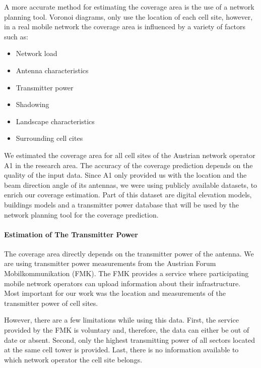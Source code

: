 \documentclass[twocolumn]{bmcart}%
\begin{document}
A more accurate method for estimating the coverage area is the use of a network planning tool. Voronoi diagrams, only use the location of each cell site, however, in a real mobile network the coverage area is influenced by a variety of factors such as:
\begin{itemize}
	\item Network load
	\item Antenna characteristics
	\item Transmitter power
	\item Shadowing
	\item Landscape characteristics
	\item Surrounding cell cites
\end{itemize}

We estimated the coverage area for all cell sites of the Austrian network operator A1 in the research area. The accuracy of the coverage prediction depends on the quality of the input data. Since A1 only provided us with the location and the beam direction angle of its antennas, we were using publicly available datasets, to enrich our coverage estimation. Part of this dataset are digital elevation models, buildings models and a transmitter power database that will be used by the network planning tool for the coverage prediction.

\paragraph{Estimation of The Transmitter Power}
The coverage area directly depends on the transmitter power of the antenna. We are using transmitter power measurements from the Austrian Forum Mobilkommunikation (FMK). The FMK  provides a service where participating mobile network operators can upload information about their infrastructure. Most important for our work was the location and measurements of the transmitter power of cell sites.

However, there are a few limitations while using this data. First, the service provided by the FMK is voluntary and, therefore, the data can either be out of date or absent. Second, only the highest transmitting power of all sectors located at the same cell tower is provided. Last, there is no information available to which network operator the cell site belongs.
\end{document}
